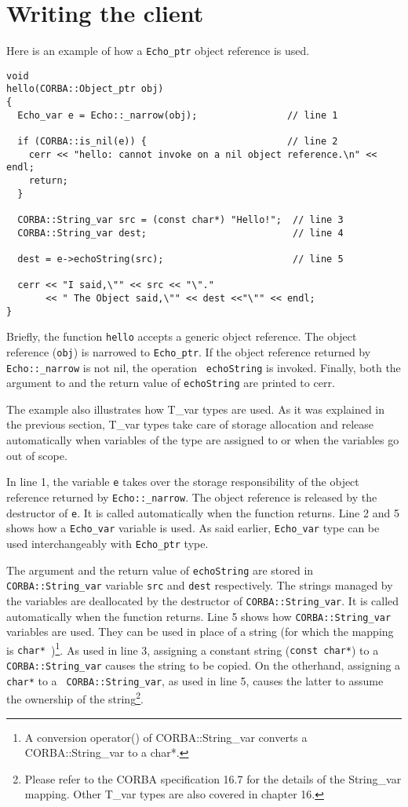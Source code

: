 \documentclass[11pt,twoside,onecolumn]{book}
\begin{document}
\section{Writing the client}

Here is an example of how a {\tt Echo\_ptr} object reference is used.

{\small
\begin{verbatim}
void
hello(CORBA::Object_ptr obj)
{
  Echo_var e = Echo::_narrow(obj);                // line 1

  if (CORBA::is_nil(e)) {                         // line 2
    cerr << "hello: cannot invoke on a nil object reference.\n" << endl;
    return;
  }

  CORBA::String_var src = (const char*) "Hello!";  // line 3
  CORBA::String_var dest;                          // line 4

  dest = e->echoString(src);                       // line 5

  cerr << "I said,\"" << src << "\"."
       << " The Object said,\"" << dest <<"\"" << endl;
}
\end{verbatim}
}

Briefly, the function {\tt hello} accepts a generic object reference. The
object reference ({\tt obj}) is narrowed to {\tt Echo\_ptr}. If the object
reference returned by {\tt Echo::\_narrow} is not nil, the operation {\tt
echoString} is invoked. Finally, both the argument to and the return value of
{\tt echoString} are printed to cerr.

The example also illustrates how T\_var types are used. As it was explained
in the previous section, T\_var types take care of storage allocation and
release automatically when variables of the type are assigned to or when
the variables go out of scope. 

In line 1, the variable {\tt e} takes over the storage responsibility of
the object reference returned by {\tt Echo::\_narrow}. The object reference
is released by the destructor of {\tt e}. It is called automatically when
the function returns. Line 2 and 5 shows how a {\tt Echo\_var} variable is
used. As said earlier, {\tt Echo\_var} type can be used interchangeably with
{\tt Echo\_ptr} type.

The argument and the return value of {\tt echoString} are stored in {\tt
CORBA::String\_var} variable {\tt src} and {\tt dest} respectively. The
strings managed by the variables are deallocated by the destructor of
{\tt CORBA::String\_var}. It is called automatically when the function
returns. Line 5 shows how {\tt CORBA::String\_var} variables are used. They
can be used in place of a string (for which the mapping is {\tt char*
})\footnote{A conversion operator() of CORBA::String\_var converts a
CORBA::String\_var to a char*.}. As used in line 3, assigning a constant
string ({\tt const char*}) to a {\tt CORBA::String\_var} causes the string
to be copied. On the otherhand, assigning a {\tt char*} to a {\tt
CORBA::String\_var}, as used in line 5, causes the latter to assume
the ownership of the string\footnote{Please refer to the CORBA
specification 16.7 for the details of the String\_var mapping. Other T\_var
types are also covered in chapter 16.}. 
\end{document}
